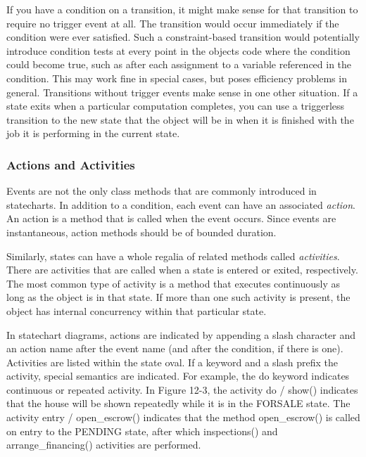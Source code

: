 If you have a condition on a transition, it might make sense for that
transition to require no trigger event at all. The transition would
occur immediately if the condition were ever satisfied. Such a
constraint-based transition would potentially introduce condition tests
at every point in the object{\textquotesingle}s code where the
condition could become true, such as after each assignment to a
variable referenced in the condition. This may work fine in special
cases, but poses efficiency problems in general. Transitions without
trigger events make sense in one other situation. If a state exits when
a particular computation completes, you can use a triggerless
transition to the new state that the object will be in when it is
finished with the job it is performing in the current state.

\subsubsection{Actions and Activities}

Events are not the only class methods that are commonly introduced in
statecharts. In addition to a condition, each event can have an
associated \textit{action}. An action is a
method that is called when the event occurs. Since events are
instantaneous, action methods should be of bounded duration.

Similarly, states can have a whole regalia of related methods called
\textit{activities}. There are activities
that are called when a state is entered or exited, respectively. The
most common type of activity is a method that executes continuously as
long as the object is in that state. If more than one such activity is
present, the object has internal concurrency within that particular
state.

In statechart diagrams, actions are indicated by appending a slash
character and an action name after the event name (and after the
condition, if there is one). Activities are listed within the state
oval. If a keyword and a slash prefix the activity, special semantics
are indicated. For example, the \textsf{do} keyword indicates
continuous or repeated activity. In Figure 12-3, the activity
\textsf{do / show()} indicates that the house will be shown repeatedly
while it is in the FORSALE state. The activity \textsf{entry /
open\_escrow()} indicates that the method \textsf{open\_escrow()} is
called on entry to the PENDING state, after which
\textsf{inspections()} and \textsf{arrange\_financing()} activities are
performed.

